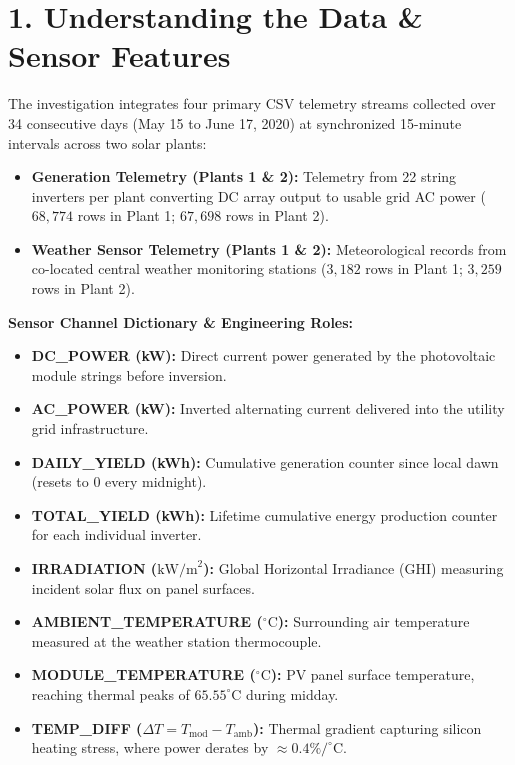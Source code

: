 \documentclass[10pt,a4paper]{article}
\begin{document}
\section*{1. Understanding the Data \& Sensor Features}
The investigation integrates four primary CSV telemetry streams collected over 34 consecutive days (May 15 to June 17, 2020) at synchronized 15-minute intervals across two solar plants:
\begin{itemize}[leftmargin=14pt,itemsep=1.5pt,topsep=2pt,parsep=0pt]
    \item \textbf{Generation Telemetry (Plants 1 \& 2):} Telemetry from 22 string inverters per plant converting DC array output to usable grid AC power ($68,774$ rows in Plant 1; $67,698$ rows in Plant 2).
    \item \textbf{Weather Sensor Telemetry (Plants 1 \& 2):} Meteorological records from co-located central weather monitoring stations ($3,182$ rows in Plant 1; $3,259$ rows in Plant 2).
\end{itemize}

\textbf{Sensor Channel Dictionary \& Engineering Roles:}
\begin{itemize}[leftmargin=14pt,itemsep=2pt,topsep=2pt,parsep=0pt]
    \item \textbf{DC\_POWER (kW):} Direct current power generated by the photovoltaic module strings before inversion.
    \item \textbf{AC\_POWER (kW):} Inverted alternating current delivered into the utility grid infrastructure.
    \item \textbf{DAILY\_YIELD (kWh):} Cumulative generation counter since local dawn (resets to 0 every midnight).
    \item \textbf{TOTAL\_YIELD (kWh):} Lifetime cumulative energy production counter for each individual inverter.
    \item \textbf{IRRADIATION ($\text{kW/m}^2$):} Global Horizontal Irradiance (GHI) measuring incident solar flux on panel surfaces.
    \item \textbf{AMBIENT\_TEMPERATURE ($^\circ\text{C}$):} Surrounding air temperature measured at the weather station thermocouple.
    \item \textbf{MODULE\_TEMPERATURE ($^\circ\text{C}$):} PV panel surface temperature, reaching thermal peaks of $65.55^\circ\text{C}$ during midday.
    \item \textbf{TEMP\_DIFF ($\Delta T = T_{\text{mod}} - T_{\text{amb}}$):} Thermal gradient capturing silicon heating stress, where power derates by $\approx 0.4\%/^\circ\text{C}$.
\end{itemize}
\end{document}
